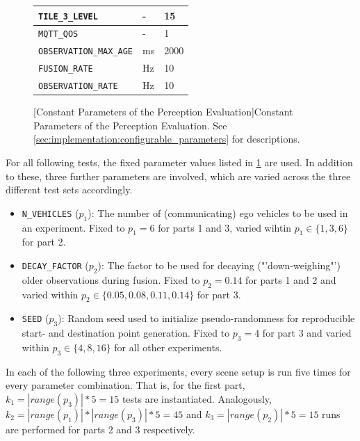 \begin{figure}
\begin{minipage}{0.5\textwidth}
\begin{tabular}{|p{4.1cm}|p{1.1cm}|p{1.4cm}|}
			\texttt{TILE\_3\_LEVEL} & - & 15 \\ 
			\hline 
			\texttt{MQTT\_QOS} & - & 1 \\ 
			\hline 
			\texttt{OBSERVATION\_MAX\_AGE} & ms & 2000 \\ 
			\hline 
			\texttt{FUSION\_RATE} & Hz & 10 \\ 
			\hline 
			\texttt{OBSERVATION\_RATE} & Hz & 10 \\ 
			\hline
		\end{tabular} 
	\end{minipage}
	[Constant Parameters of the Perception Evaluation]{Constant Parameters of the Perception Evaluation. See \cref{sec:implementation:configurable_parameters} for descriptions.}
	\label{tab:perception_evaluation:constant_parameters}
\end{figure}

For all following tests, the fixed parameter values listed in \cref{tab:perception_evaluation:constant_parameters} are used. In addition to these, three further parameters are involved, which are varied across the three different test sets accordingly. 

\begin{itemize}
	\item \texttt{N\_VEHICLES} ($p_1$): The number of (communicating) ego vehicles to be used in an experiment. Fixed to $p_1 = 6$ for parts 1 and 3, varied wihtin $p_1 \in \{1, 3, 6\}$ for part 2.
	\item \texttt{DECAY\_FACTOR} ($p_2$): The factor to be used for decaying ("'down-weighing"') older observations during fusion. Fixed to $p_2 = 0.14$ for parts 1 and 2 and varied within $p_2 \in \{0.05, 0.08, 0.11, 0.14\}$ for part 3.
	\item \texttt{SEED} ($p_3$): Random seed used to initialize pseudo-randomness for reproducible start- and destination point generation. Fixed to $p_3 = 4$ for part 3 and varied within $p_3 \in \{4, 8, 16\}$ for all other experiments.
\end{itemize}

In each of the following three experiments, every scene setup is run five times for every parameter combination. That is, for the first part, $k_1 = |\textit{range}(p_3)| * 5 = 15$ tests are instantiated. Analogously, $k_2 = |\textit{range}(p_1)| * |\textit{range}(p_3)| * 5 = 45$ and $k_3 = |\textit{range}(p_2)| * 5 = 15$ runs are performed for parts 2 and 3 respectively.
\par
\bigskip

